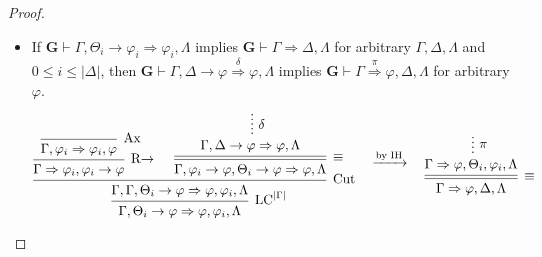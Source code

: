\documentclass[12pt]{article}
\newcommand\A{\varphi}
\newcommand\GG\Gamma
\newcommand\D\Delta
\newcommand\T\Theta
\newcommand\LL\Lambda
\newcommand\TO\Rightarrow
\newcommand\PC[1]{\mathbf{#1}}
\newcommand\LC{\textrm{LC}}
\newcommand\RI{\textrm{R$\to$}}
\begin{document}
\begin{enumerate}
\begin{enumerate}
\begin{proof}
\begin{itemize}
                \item If $\PC{G}\vdash\GG,\T_i\to\A_i\TO\A_i,\LL$ implies $\PC{G}\vdash\GG\TO\D,\LL$ for arbitrary $\GG,\D,\LL$ and $0\le i\le|\D|$, then $\PC{G}\vdash\GG,\D\to\A\overset{\delta}{\TO}\A,\LL$ implies $\PC{G}\vdash\GG\overset{\pi}{\TO}\A,\D,\LL$ for arbitrary $\A$.
                \[
                \begin{prooftree}
                \infer0[Ax]{\GG,\A_i\TO\A_i,\A}
                \infer1[$\RI$]{\GG\TO\A_i,\A_i\to\A}
                \hypo{}
                \ellipsis{$\delta$}{\GG,\D\to\A\TO\A,\LL}
                \infer[double]1[$\equiv$]{\GG,\A_i\to\A,\T_i\to\A\TO\A,\LL}
                \infer2[Cut]{\GG,\GG,\T_i\to\A\TO\A,\A_i,\LL}
                \infer1[$\LC^{|\GG|}$]{\GG,\T_i\to\A\TO\A,\A_i,\LL}
                \end{prooftree}
                \quad \xrightarrow{\text{by IH}} \quad
                \begin{prooftree}
                \hypo{}
                \ellipsis{$\pi$}{\GG\TO\A,\T_i,\A_i,\LL}
                \infer[double]1[$\equiv$]{\GG\TO\A,\D,\LL}
                \end{prooftree}
                \]
            \end{itemize}
        \end{proof}
        

\end{enumerate}
\end{enumerate}
\end{document}
